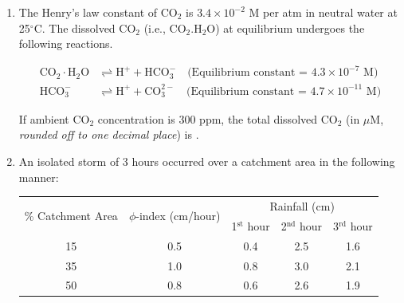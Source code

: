 \documentclass[12pt,a4paper]{article}
\begin{document}
\begin{enumerate}
   \item The Henry's law constant of CO$_2$ is $3.4 \times 10^{-2}$ M per atm in neutral water at 25$^\circ$C. The dissolved CO$_2$ (i.e., CO$_2$.H$_2$O) at equilibrium undergoes the following reactions.

         \begin{align*}
            \text{CO}_2 \cdot \text{H}_2\text{O} & \rightleftharpoons \text{H}^+ + \text{HCO}_3^- \quad \text{(Equilibrium constant = $4.3 \times 10^{-7}$ M)}    \\
            \text{HCO}_3^-                       & \rightleftharpoons \text{H}^+ + \text{CO}_3^{2-} \quad \text{(Equilibrium constant = $4.7 \times 10^{-11}$ M)}
         \end{align*}

         If ambient CO$_2$ concentration is 300 ppm, the total dissolved CO$_2$ (in $\mu$M, \textit{rounded off to one decimal place}) is \underline{\hspace{2cm}}.

   \item An isolated storm of 3 hours occurred over a catchment area in the following manner:

         \begin{table}[H]
            \centering
            \begin{tabular}{|c|c|c|c|c|}
               \hline
               \multirow{2}{*}{\% Catchment Area} & \multirow{2}{*}{$\phi$-index (cm/hour)} & \multicolumn{3}{|c|}{Rainfall (cm)}                                           \\\cline{3-5}
                                                  &                                         & 1$^\text{st}$ hour                  & 2$^\text{nd}$ hour & 3$^\text{rd}$ hour \\
               \hline
               15                                 & 0.5                                     & 0.4                                 & 2.5                & 1.6                \\\hline
               35                                 & 1.0                                     & 0.8                                 & 3.0                & 2.1                \\\hline
               50                                 & 0.8                                     & 0.6                                 & 2.6                & 1.9                \\\hline
            \end{tabular}
            \label{tab:q56}
         \end{table}


\end{enumerate}
\end{document}
